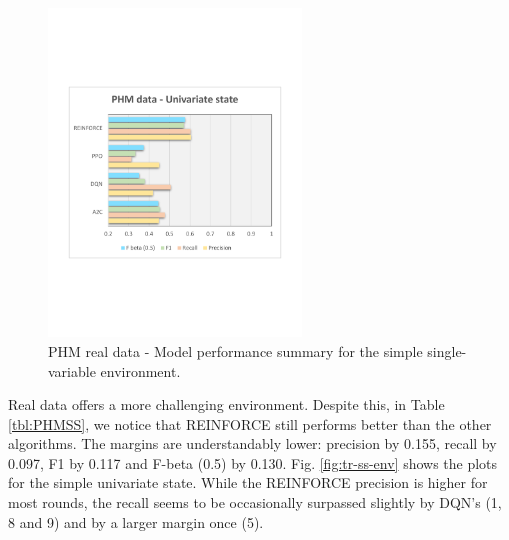 \documentclass[a4paper, 12pt]{article}
\begin{document}
\begin{figure}[h]
	\centering
	\includegraphics[width=0.6\textwidth, trim={1.5cm 7cm 1cm 7cm}]{images/PHMSSPlot.pdf}  
	\caption{PHM real data - Model performance summary for the simple single-variable environment.}
	\label{fig:PHMSS}
\end{figure}
Real data offers a more challenging environment. Despite this, in Table \ref{tbl:PHMSS}, we notice that REINFORCE  still performs better than the other algorithms. The margins are understandably lower: precision by 0.155, recall by 0.097, F1 by 0.117 and F-beta (0.5) by 0.130. Fig. \ref{fig:tr-ss-env} shows the plots for the simple univariate state. While the REINFORCE precision is higher for most rounds, the recall seems to be occasionally surpassed slightly by DQN's (1, 8 and 9) and by a larger margin once (5).
\end{document}
